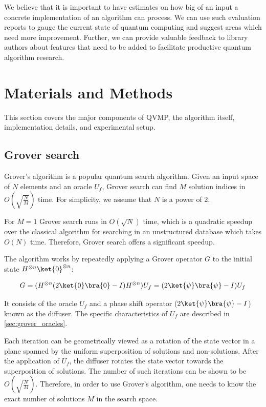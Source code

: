 \documentclass[11pt]{article}
\theoremstyle{definition}
\theoremstyle{remark}
\begin{document}
We believe that it is important to have estimates on how big of an input a
concrete implementation of an algorithm can process. We can use such evaluation
reports to gauge the current state of quantum computing and suggest areas which
need more improvement. Further, we can provide valuable feedback to library
authors about features that need to be added to facilitate productive quantum
algorithm research.

\section{Materials and Methods}

This section covers the major components of QVMP, the algorithm itself,
implementation details, and experimental setup.

\subsection{Grover search} \label{sec:grover_search}

Grover’s algorithm is a popular quantum search algorithm. Given an input space
of $N$ elements and an oracle $U_f$, Grover search can find $M$ solution
indices in $O(\sqrt{\frac{N}{M}})$ time. For simplicity, we assume that $N$ is
a power of 2. 

For $M = 1$ Grover search runs in $O(\sqrt{N})$ time, which is a quadratic
speedup over the classical algorithm for searching in an unstructured database
which takes $O(N)$ time. Therefore, Grover search offers a significant speedup.

The algorithm works by repeatedly applying a Grover operator $G$ to the initial
state $H^{\otimes n}\ket{0}^{\otimes n }$:

\begin{equation}
  G = (H^{\otimes n}(2\ket{0}\bra{0} - I)H^{\otimes n})U_f = (2\ket{\psi}\bra{\psi} - I)U_f
\end{equation}

It consists of the oracle $U_f$ and a phase shift operator
($2\ket{\psi}\bra{\psi} - I$) known as the diffuser. The specific
characteristics of $U_f$ are described in \cref{sec:grover_oracles}.

Each iteration can be geometrically viewed as a rotation of the state vector in
a plane spanned by the uniform superposition of solutions and non-solutions.
After the application of $U_f$, the diffuser rotates the state vector towards
the superposition of solutions. The number of such iterations can be shown to
be  $O(\sqrt{\frac{N}{M}})$. Therefore, in order to use Grover’s algorithm, one
needs to know the exact number of solutions $M$ in the search space.
\end{document}
